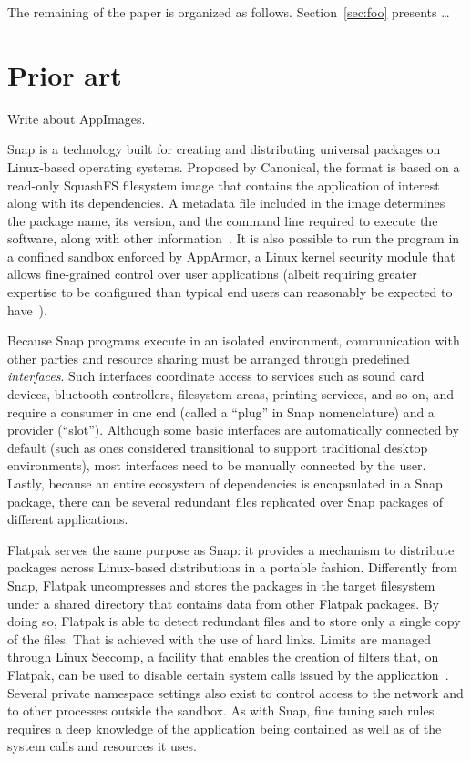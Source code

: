 \documentclass[sigplan, anonymous, 10pt]{acmart}
\begin{document}
The remaining of the paper is organized as follows. Section~\ref{sec:foo} presents \ldots

\section{Prior art}

Write about AppImages.

Snap is a technology built for creating and distributing universal packages on Linux-based
operating systems. Proposed by Canonical, the format is based on a read-only SquashFS filesystem
image that contains the application of interest along with its dependencies. A metadata file
included in the image determines the package name, its version, and the command line required
to execute the software, along with other information~\cite{canonical2011:snapcraft}.
It is also possible to run the program in a confined sandbox enforced by AppArmor, a Linux kernel
security module that allows fine-grained control over user applications (albeit requiring greater
expertise to be configured than typical end users can reasonably be expected to
have~\cite{schreuders2011:empowering}).

Because Snap programs execute in an isolated environment, communication with other parties
and resource sharing must be arranged through predefined \emph{interfaces}. Such interfaces
coordinate access to services such as sound card devices, bluetooth controllers, filesystem
areas, printing services, and so on, and require a consumer in one end (called a ``plug''
in Snap nomenclature) and a provider (``slot''). Although some basic interfaces are automatically
connected by default (such as ones considered transitional to support traditional desktop
environments), most interfaces need to be manually connected by the user. Lastly, because
an entire ecosystem of dependencies is encapsulated in a Snap package, there can be several
redundant files replicated over Snap packages of different applications.

Flatpak serves the same purpose as Snap: it provides a mechanism to distribute packages
across Linux-based distributions in a portable fashion. Differently from Snap, Flatpak
uncompresses and stores the packages in the target filesystem under a shared directory
that contains data from other Flatpak packages. By doing so, Flatpak is able to detect
redundant files and to store only a single copy of the files. That is achieved with the
use of hard links. Limits are managed through Linux Seccomp, a facility that enables
the creation of filters that, on Flatpak, can be used to disable certain system calls
issued by the application~\cite{lwn2015:seccomp}. Several private namespace settings
also exist to control access to the network and to other processes outside the sandbox.
As with Snap, fine tuning such rules requires a deep knowledge of the application being
contained as well as of the system calls and resources it uses.
\end{document}
